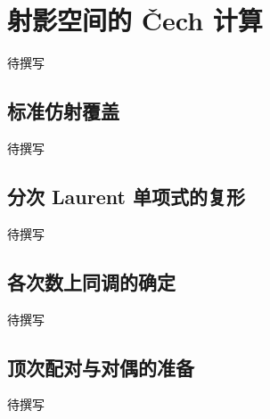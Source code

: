
% 
% 

\section{射影空间的 Čech 计算}
\label{g5:sec:1901}

待撰写

\subsection{标准仿射覆盖}
\label{g5:subsec:1901:01}
待撰写

\subsection{分次 Laurent 单项式的复形}
\label{g5:subsec:1901:02}
待撰写

\subsection{各次数上同调的确定}
\label{g5:subsec:1901:03}
待撰写

\subsection{顶次配对与对偶的准备}
\label{g5:subsec:1901:04}
待撰写
